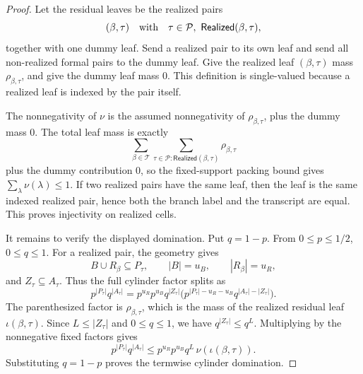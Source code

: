 \begin{proof}
Let the residual leaves be the realized pairs
\[
(\beta,\tau)\quad\hbox{with}\quad
\tau\in\mathcal P,\ \mathsf{Realized}(\beta,\tau),
\]
together with one dummy leaf.  Send a realized pair to its own leaf and send
all non-realized formal pairs to the dummy leaf.  Give the realized leaf
\((\beta,\tau)\) mass \(\rho_{\beta,\tau}\), and give the dummy leaf mass
\(0\).  This definition is single-valued because a realized leaf is indexed
by the pair itself.

The nonnegativity of \(\nu\) is the assumed nonnegativity of
\(\rho_{\beta,\tau}\), plus the dummy mass \(0\).  The total leaf mass is
exactly
\[
\sum_{\beta\in\mathcal T}
  \sum_{\tau\in\mathcal P:\mathsf{Realized}(\beta,\tau)}
    \rho_{\beta,\tau}
\]
plus the dummy contribution \(0\), so the fixed-support packing bound gives
\(\sum_\lambda\nu(\lambda)\le1\).  If two realized pairs have the same leaf,
then the leaf is the same indexed realized pair, hence both the branch label
and the transcript are equal.  This proves injectivity on realized cells.

It remains to verify the displayed domination.  Put \(q=1-p\).  From
\(0\le p\le1/2\), \(0\le q\le1\).  For a realized pair, the geometry gives
\[
B\cup R_\beta\subseteq P_\tau,\qquad |B|=u_B,\qquad |R_\beta|=u_R,
\]
and \(Z_\tau\subseteq A_\tau\).  Thus the full cylinder factor splits as
\[
p^{|P_\tau|}q^{|A_\tau|}
=
p^{u_R}p^{u_B}q^{|Z_\tau|}
  \bigl(p^{|P_\tau|-u_R-u_B}q^{|A_\tau|-|Z_\tau|}\bigr).
\]
The parenthesized factor is \(\rho_{\beta,\tau}\), which is the mass of the
realized residual leaf \(\iota(\beta,\tau)\).  Since
\(L\le |Z_\tau|\) and \(0\le q\le1\), we have \(q^{|Z_\tau|}\le q^L\).
Multiplying by the nonnegative fixed factors gives
\[
p^{|P_\tau|}q^{|A_\tau|}
\le
p^{u_R}p^{u_B}q^L\,\nu(\iota(\beta,\tau)).
\]
Substituting \(q=1-p\) proves the termwise cylinder domination.
\end{proof}
